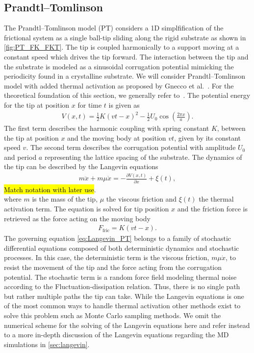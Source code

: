 \subsection{Prandtl–Tomlinson} %
The Prandtl–Tomlinson model (\acrshort{PT}) considers a 1D simplfification of
the frictional system as a single ball-tip sliding along the rigid substrate as
shown in \cref{fig:PT_FK_FKT}. The tip is coupled harmonically to a support
moving at a constant speed which drives the tip forward. The interaction between
the tip and the substrate is modeled as a sinusoidal corrugation potential
mimicking the periodicity found in a crystalline substrate. We will consider
Prandtl–Tomlinson model with added thermal activation as proposed by Gnecco et
al.~\cite{PhysRevLett.84.1172}. For the theoretical foundation of this section,
we generally refer to~\cite{Yalin_2011}. The potential energy for the tip at position $x$ for time $t$ is
given as
\begin{align}
  V(x,t) = \frac{1}{2}K(vt - x)^2 - \frac{1}{2}U_0 \cos \left(\frac{2\pi x}{a} \right).
  \label{eq:V_PT}
\end{align}
The first term describes the harmonic coupling with spring constant $K$, between the tip at position $x$ and the moving body at position $vt$, given by its constant speed $v$. The second term describes the corrugation potential with amplitude $U_0$ and period $a$ representing the lattice spacing of the substrate. The dynamics of the tip can be described by the Langevin equations 
\begin{align}
  m \ddot{x}+m \mu \dot{x}=-\frac{\partial V(x, t)}{\partial x}+\xi(t),
  \label{eq:Langevin_PT}
\end{align}
\hl{Match notation with later use}. \\
where $m$ is the mass of the tip, $\mu$ the viscous friction and $\xi(t)$ the thermal activation term. The equation is solved for tip position $x$ and the friction force is retrieved as the force acting on the moving body
\begin{align*}
  F_{\text{fric}} = K(vt - x).
\end{align*}
The governing equation \cref{eq:Langevin_PT} belongs to a family of stochastic differential equations composed of both deterministic dynamics and stochastic processes. In this case, the deterministic term is the viscous friction, $m\mu\dot{x}$, to resist the movement of the tip and the force acting from the corrugation potential. The stochastic term is a random force field modeling thermal noise according to the Fluctuation-dissipation relation. Thus, there is no single path but rather multiple paths the tip can take. While the Langevin equations is one of the most common ways to handle thermal activation other methods exist to solve this problem such as Monte Carlo sampling methods. We omit the numerical scheme for the solving of the Langevin equations here and refer instead to a more in-depth discussion of the Langevin equations regarding the \acrshort{MD} simulations in \cref{sec:langevin}. 



